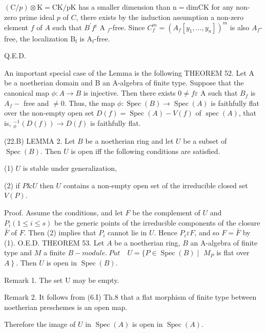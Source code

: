$(\mathrm{C} / p) \otimes \mathrm{K}=\mathrm{CK} / \mathrm{pK}$ has a smaller dimension than $\mathrm{n}=\mathrm{dim} \mathrm{CK}$ for any non-zero prime ideal $p$ of $C$, there exists by the induction assumption a non-zero element $f$ of $A$ such that $B^{\prime} f{ }^{i}$ A $_{f}$-free. Since $C_{f}^{m}=\left(A_{f}\left[y_{1}, \ldots, y_{n}\right]\right)^{m}$ is also $A_{f}$-free, the localization $\mathrm{B}_{\mathrm{f}}$ is $\mathrm{A}_{\mathrm{f}}$-free.

Q.E.D.

An important special case of the Lemma is the following THEOREM 52. Let A be a noetherian domain and B an A-algebra of finite type. Suppose that the canonical map $\phi: A \rightarrow B$ is injective. Then there exists $0 \neq f \varepsilon$ A such that $B_{f}$ is $A_{f}-$ free and $\neq 0 .$ Thus, the map $\phi: \operatorname{Spec}(B) \rightarrow \operatorname{Spec}(A)$ is faithfully flat over the non-empty open set $D(f)=\operatorname{Spec}(A)-V(f)$ of $\operatorname{spec}(A)$, that is, ${ }_{\phi}^{-1}(D(f)) \rightarrow D(f)$ is faithfully flat.

(22.B) LEMMA 2. Let $B$ be a noetherian ring and let $U$ be a subset of $\operatorname{Spec}(B)$. Then $U$ is open iff the following conditions are satisfied.

(1) $U$ is stable under generalization,

(2) if $P \& U$ then $U$ contains a non-empty open set of the irreducible closed set $V(P)$.

Proof. Assume the conditions, and let $F$ be the complement of $U$ and $P_{i}(1 \leqslant i \leqslant s)$ be the generic points of the irreducible components of the closure $\bar{F}$ of $F$. Then (2) implies that $P_{i}$ cannot lie in $U$. Hence $P_{i} \varepsilon F$, and so $F=\bar{F}$ by (1). O.E.D. THEOREM 53. Let $A$ be a noetherian ring, $B$ an A-algebra of finite type and $M$ a finite $B-m o d u l e . ~ P u t \quad U=\{P \in \operatorname{Spec}(B) \mid$ $M_{P}$ is flat over $\left.A\right\}$. Then $U$ is open in $\operatorname{Spec}(B) .$

Remark 1. The set U may be empty.

Remark 2. It follows from (6.I) Th.8 that a flat morphism of finite type between noetherian preschemes is an open map.

Therefore the image of $U$ in $\operatorname{Spec}(A)$ is open in $\operatorname{Spec}(A)$.

